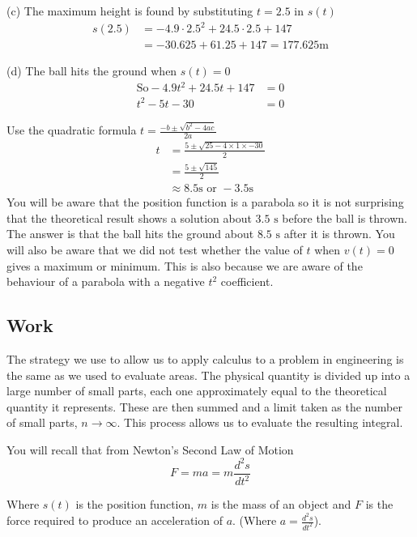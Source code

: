 (c) The maximum height is found by substituting
$t =2.5$ in $s (t)$
\begin{align*}s (2.5) &  =  -4.9 \cdot 2.5^{2} +24.5 \cdot 2.5 +147 \\
 &  =  -30.625 +61.25 +147 =177.625 \mbox{m}\end{align*}

(d) The ball hits the ground when $s (t) =0$
\begin{align*}\text{So} -4.9 t^{2} +24.5 t +147 &  = 0 \\
t^{2} -5 t -30 &  = 0\end{align*}

Use the quadratic formula $t =\frac{ -b \pm \sqrt{b^{2} -4 a c}}{2 a}$
\begin{align*}t &  = \frac{5 \pm \sqrt{25 -4 \times 1 \times  -30}}{2} \\
 &  = \frac{5 \pm \sqrt{145}}{2} \\
 &  \approx 8.5\text{}\mbox{s}\text{ or } -3.5\text{}\mbox{s}\end{align*}
You will be aware that the position function is a parabola so it is not surprising that the theoretical result shows a solution about $3.5 \mbox{ s}$ before the ball is thrown. The
answer is that the ball hits the ground about $8.5 \mbox{ s}$ after it is thrown. You will also be aware that we did not test whether the value of $t$ when $v (t) =0$ gives a maximum or minimum. This is also because we are aware of the behaviour of a parabola with a negative $t^{2}$ coefficient. 

\subsection*{Work}
The strategy we use to allow us to apply calculus to a problem in engineering is the same as we used to evaluate areas. The
physical quantity is divided up into a large number of small parts, each one approximately equal to the theoretical quantity it represents. These
are then summed and a limit taken as the number of small parts, $n \rightarrow \infty $. This process allows us to evaluate the resulting integral. 

You
will recall that from Newton's Second Law of Motion
\begin{equation}F =m a =m \frac{d^{2} s}{d t^{2}}\tag{1}
\end{equation}

Where $s (t)$ is the position function, $m$ is the mass of an object and $F$ is the force required to produce an acceleration of $a$. (Where $a =\frac{d^{2} s}{d t^{2}}$). 

